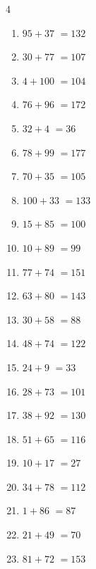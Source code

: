 \begin{multicols}{4}
\begin{enumerate}
  \item $95+37$
        $=132$

  \item $30+77$
        $=107$

  \item $4+100$
        $=104$

  \item $76+96$
        $=172$

  \item $32+4$
        $=36$

  \item $78+99$
        $=177$

  \item $70+35$
        $=105$

  \item $100+33$
        $=133$

  \item $15+85$
        $=100$

  \item $10+89$
        $=99$

  \item $77+74$
        $=151$

  \item $63+80$
        $=143$

  \item $30+58$
        $=88$

  \item $48+74$
        $=122$

\columnbreak %

  \item $24+9$
        $=33$

  \item $28+73$
        $=101$

  \item $38+92$
        $=130$

  \item $51+65$
        $=116$

  \item $10+17$
        $=27$

  \item $34+78$
        $=112$

  \item $1+86$
        $=87$

  \item $21+49$
        $=70$

  \item $81+72$
        $=153$


\end{enumerate}
\end{multicols}
